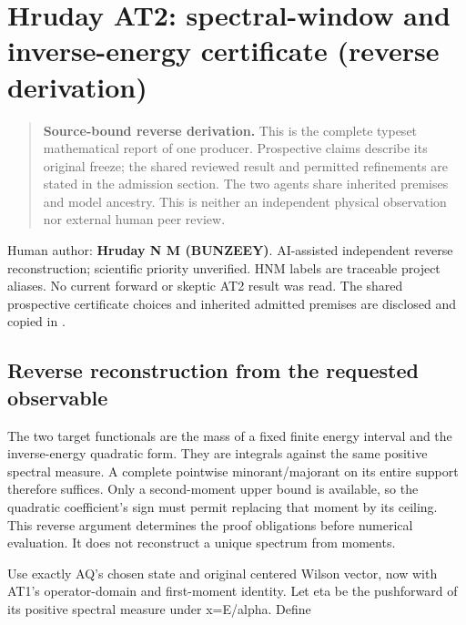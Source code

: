 \hypertarget{r30-at2-reverse-hruday-spectral-window-and-inverse-energy-certificate-reverse-at2}{%
\section{Hruday AT2: spectral-window and inverse-energy certificate (reverse derivation)}\label{r30:at2:reverse:r30-at2-reverse-hruday-spectral-window-and-inverse-energy-certificate-reverse-at2}}

\begin{quote}\small\textbf{Source-bound reverse derivation.} This is the complete typeset mathematical report of one producer. Prospective claims describe its original freeze; the shared reviewed result and permitted refinements are stated in the admission section. The two agents share inherited premises and model ancestry. This is neither an independent physical observation nor external human peer review.\end{quote}
Human author: \textbf{Hruday N M (BUNZEEY)}. AI-assisted independent reverse reconstruction; scientific priority unverified. HNM labels are traceable project aliases. No current forward or skeptic AT2 result was read. The shared prospective certificate choices and inherited admitted premises are disclosed and copied in {\small{}}.

\hypertarget{r30-at2-reverse-reverse-reconstruction-from-the-requested-observable}{%
\subsection{Reverse reconstruction from the requested observable}\label{r30:at2:reverse:r30-at2-reverse-reverse-reconstruction-from-the-requested-observable}}

The two target functionals are the mass of a fixed finite energy interval and the inverse-energy quadratic form. They are integrals against the same positive spectral measure. A complete pointwise minorant/majorant on its entire support therefore suffices. Only a second-moment upper bound is available, so the quadratic coefficient's sign must permit replacing that moment by its ceiling. This reverse argument determines the proof obligations before numerical evaluation. It does not reconstruct a unique spectrum from moments.

Use exactly AQ's chosen state and original centered Wilson vector, now with AT1's operator-domain and first-moment identity. Let eta be the pushforward of its positive spectral measure under x=E/alpha. Define

